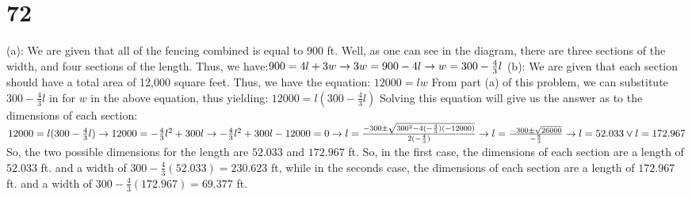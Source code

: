 \documentclass{article}
\theoremstyle{definition}
\begin{document}
\section*{72}
(a): We are given that all of the fencing combined is equal to $900$ ft. Well, as one can see in the diagram, there are three sections of the width, and 
four sections of the length. Thus, we have:\newline $900=4l+3w\newline\rightarrow 
3w=900-4l\newline\rightarrow
w=300-\frac{4}{3}l$\newline 
(b): We are given that each section should have a total area of 12,000 square feet. Thus, we have the equation:\newline 
$12000=lw$\newline 
From part (a) of this problem, we can substitute $300-\frac{4}{3}l$ in for $w$ in the above equation, thus yielding:\newline
$12000=l(300-\frac{4}{3}l)$\newline 
Solving this equation will give us the answer as to the dimensions of each section:\newline 
$12000=l(300-\frac{4}{3}l)\newline\rightarrow 
12000=-\frac{4}{3}l^2+300l\newline\rightarrow 
-\frac{4}{3}l^2+300l-12000=0\newline\rightarrow 
l=\frac{-300\pm\sqrt{300^2-4(-\frac{4}{3})(-12000)}}{2(-\frac{4}{3})}\newline\rightarrow 
l=\frac{-300\pm\sqrt{26000}}{-\frac{8}{3}}\newline\rightarrow 
l=52.033\vee l=172.967$\newline
So, the two possible dimensions for the length are $52.033$ and $172.967$ ft. So, in the first case, the dimensions of each section are a length of 
$52.033$ ft. and a width of $300-\frac{4}{3}(52.033)=230.623$ ft, while in the seconds case, the dimensions of each section are a length of $172.967$ ft. 
and a width of $300-\frac{4}{3}(172.967)=69.377$ ft.
\end{document}
